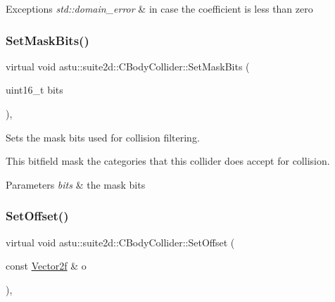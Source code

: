\begin{DoxyExceptions}{Exceptions}
{\em std\+::domain\+\_\+error} & in case the coefficient is less than zero \\
\hline
\end{DoxyExceptions}
\mbox{\label{classastu_1_1suite2d_1_1CBodyCollider_aa7411ba5c94adecc996d655bd38c7fb8}} 
\subsubsection{\texorpdfstring{Set\+Mask\+Bits()}{SetMaskBits()}}
{\footnotesize\ttfamily virtual void astu\+::suite2d\+::\+C\+Body\+Collider\+::\+Set\+Mask\+Bits (\begin{DoxyParamCaption}\item[{uint16\+\_\+t}]{bits }\end{DoxyParamCaption})\hspace{0.3cm}{\ttfamily [inline]}, {\ttfamily [virtual]}}

Sets the mask bits used for collision filtering.

This bitfield mask the categories that this collider does accept for collision.


\begin{DoxyParams}{Parameters}
{\em bits} & the mask bits \\
\hline
\end{DoxyParams}
\mbox{\label{classastu_1_1suite2d_1_1CBodyCollider_aa0fe045b29e4207852be567b5e004c91}} 
\subsubsection{\texorpdfstring{Set\+Offset()}{SetOffset()}}
{\footnotesize\ttfamily virtual void astu\+::suite2d\+::\+C\+Body\+Collider\+::\+Set\+Offset (\begin{DoxyParamCaption}\item[{const \hyperlink{classastu_1_1Vector2}{Vector2f} \&}]{o }\end{DoxyParamCaption})\hspace{0.3cm}{\ttfamily [inline]}, {\ttfamily [virtual]}}

